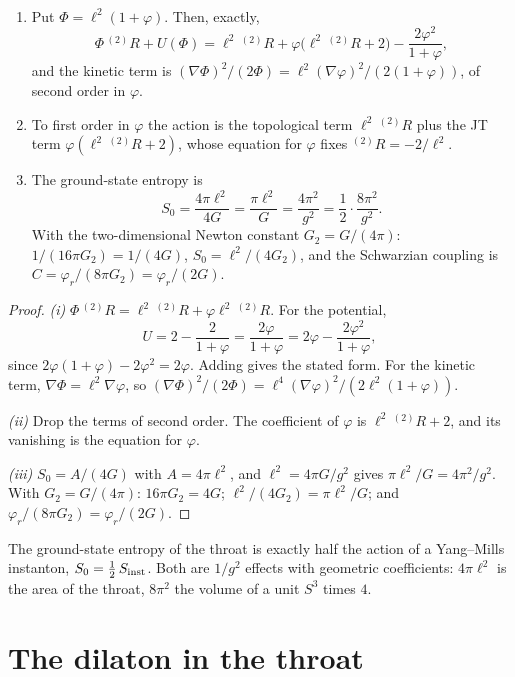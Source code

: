 \begin{theorem}[JT gravity]\label{thm:jt}\ver\
\begin{enumerate}[label=(\roman*)]
\item Put $\Phi=\ell^2(1+\varphi)$. Then, exactly,
\[
\Phi\,{}^{(2)}\!R+U(\Phi)=\ell^2\,{}^{(2)}\!R+\varphi\bigl(\ell^2\,{}^{(2)}\!R+2\bigr)-\frac{2\varphi^2}{1+\varphi},
\]
and the kinetic term is $(\nabla\Phi)^2/(2\Phi)=\ell^2(\nabla\varphi)^2/(2(1+\varphi))$, of second order in $\varphi$.
\item To first order in $\varphi$ the action is the topological term $\ell^2\,{}^{(2)}\!R$ plus the JT term $\varphi(\ell^2\,{}^{(2)}\!R+2)$, whose equation for $\varphi$ fixes ${}^{(2)}\!R=-2/\ell^2$.
\item The ground-state entropy is
\[
S_0=\frac{4\pi\ell^2}{4G}=\frac{\pi\ell^2}G=\frac{4\pi^2}{g^2}=\frac12\cdot\frac{8\pi^2}{g^2}.
\]
With the two-dimensional Newton constant $G_2=G/(4\pi)$: $1/(16\pi G_2)=1/(4G)$, $S_0=\ell^2/(4G_2)$, and the Schwarzian coupling is $C=\varphi_r/(8\pi G_2)=\varphi_r/(2G)$.
\end{enumerate}
\end{theorem}
\begin{proof}
\emph{(i)} $\Phi\,{}^{(2)}\!R=\ell^2\,{}^{(2)}\!R+\varphi\ell^2\,{}^{(2)}\!R$. For the potential,
\[
U=2-\frac2{1+\varphi}=\frac{2\varphi}{1+\varphi}=2\varphi-\frac{2\varphi^2}{1+\varphi},
\]
since $2\varphi(1+\varphi)-2\varphi^2=2\varphi$. Adding gives the stated form. For the kinetic term, $\nabla\Phi=\ell^2\nabla\varphi$, so $(\nabla\Phi)^2/(2\Phi)=\ell^4(\nabla\varphi)^2/(2\ell^2(1+\varphi))$.

\emph{(ii)} Drop the terms of second order. The coefficient of $\varphi$ is $\ell^2\,{}^{(2)}\!R+2$, and its vanishing is the equation for $\varphi$.

\emph{(iii)} $S_0=A/(4G)$ with $A=4\pi\ell^2$, and $\ell^2=4\pi G/g^2$ gives $\pi\ell^2/G=4\pi^2/g^2$. With $G_2=G/(4\pi)$: $16\pi G_2=4G$; $\ell^2/(4G_2)=\pi\ell^2/G$; and $\varphi_r/(8\pi G_2)=\varphi_r/(2G)$.
\end{proof}


The ground-state entropy of the throat is exactly half the action of a Yang--Mills instanton, $S_0=\frac12\,S_{\rm inst}$. Both are $1/g^2$ effects with geometric coefficients: $4\pi\ell^2$ is the area of the throat, $8\pi^2$ the volume of a unit $S^3$ times $4$.

\section{The dilaton in the throat}

